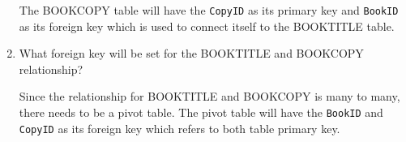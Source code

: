\documentclass[12pt,titlepage]{article}
\begin{document}
\begin{enumerate}[label=\Alph*.]
{        The BOOKCOPY table will have the \texttt{CopyID} as its primary key and \texttt{BookID} as its foreign key which is used
        to connect itself to the BOOKTITLE table.
    }
    \item {
        What foreign key will be set for the BOOKTITLE and BOOKCOPY relationship?

        Since the relationship for BOOKTITLE and BOOKCOPY is many to many, there needs to be a pivot table.
        The pivot table will have the \texttt{BookID} and \texttt{CopyID} as its foreign key which refers to
        both table primary key.
    }
\end{enumerate}
\end{document}
